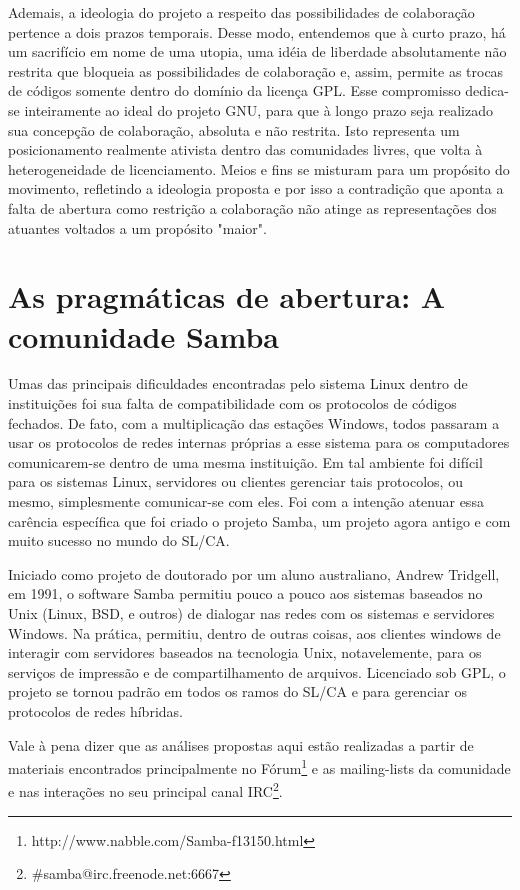 Ademais, a ideologia do projeto a respeito das possibilidades de colaboração pertence a dois prazos temporais. Desse modo, entendemos que à curto prazo, há um sacrifício em nome de uma utopia, uma idéia de liberdade absolutamente não restrita que bloqueia as possibilidades de colaboração e, assim, permite as trocas de códigos somente dentro do domínio da licença GPL. Esse compromisso dedica-se inteiramente ao ideal do projeto GNU, para que à longo prazo seja  realizado sua concepção de colaboração, absoluta e não restrita. Isto representa um posicionamento realmente ativista dentro das comunidades livres, que volta à heterogeneidade de licenciamento. Meios e fins se misturam para um propósito do movimento, refletindo a ideologia proposta e por isso a contradição que aponta a falta de abertura como restrição a colaboração não atinge as representações dos atuantes voltados a um propósito "maior".

\section{As pragmáticas de abertura: A comunidade Samba} \label{3.3}

Umas das principais dificuldades encontradas pelo sistema Linux dentro de instituições foi sua falta de compatibilidade com os protocolos de códigos fechados. De fato, com a multiplicação das estações Windows, todos passaram a usar os protocolos de redes internas próprias a esse sistema para os computadores comunicarem-se dentro de uma mesma instituição. Em tal ambiente foi difícil para os sistemas Linux, servidores ou clientes gerenciar tais protocolos, ou mesmo, simplesmente comunicar-se com eles. Foi com a intenção atenuar essa carência específica que foi criado o projeto Samba, um projeto agora antigo e com muito sucesso no mundo do SL/CA.

Iniciado como projeto de doutorado por um aluno australiano, Andrew Tridgell, em 1991, o software Samba permitiu pouco a pouco aos sistemas baseados no Unix (Linux, BSD, e outros) de dialogar nas redes com os sistemas e servidores Windows. Na prática, permitiu, dentro de outras coisas, aos clientes windows de interagir com servidores baseados na tecnologia Unix, notavelemente, para os serviços de impressão e de compartilhamento de arquivos. Licenciado sob GPL, o projeto se tornou padrão em todos os ramos do SL/CA e para gerenciar os protocolos de redes híbridas. 

Vale à pena dizer que as análises propostas aqui estão realizadas a partir de materiais encontrados principalmente no Fórum\footnote{http://www.nabble.com/Samba-f13150.html} e as mailing-lists da comunidade e nas interações no seu principal canal IRC\footnote{\#samba@irc.freenode.net:6667}.


